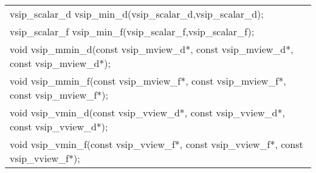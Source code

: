 \\\cvsiplh
\afh
{
\ttfamily
\\\hspace*{.04\textwidth}
\begin{tabular}{l}
vsip\_scalar\_d vsip\_min\_d(vsip\_scalar\_d,vsip\_scalar\_d);\\
vsip\_scalar\_f vsip\_min\_f(vsip\_scalar\_f,vsip\_scalar\_f);\\
void vsip\_mmin\_d(const vsip\_mview\_d*, const vsip\_mview\_d*, const vsip\_mview\_d*);\\
void vsip\_mmin\_f(const vsip\_mview\_f*, const vsip\_mview\_f*, const vsip\_mview\_f*);\\
void vsip\_vmin\_d(const vsip\_vview\_d*, const vsip\_vview\_d*, const vsip\_vview\_d*);\\
void vsip\_vmin\_f(const vsip\_vview\_f*, const vsip\_vview\_f*, const vsip\_vview\_f*);\\
\end{tabular}
}
\\\pyjvsiph
%
%
%

